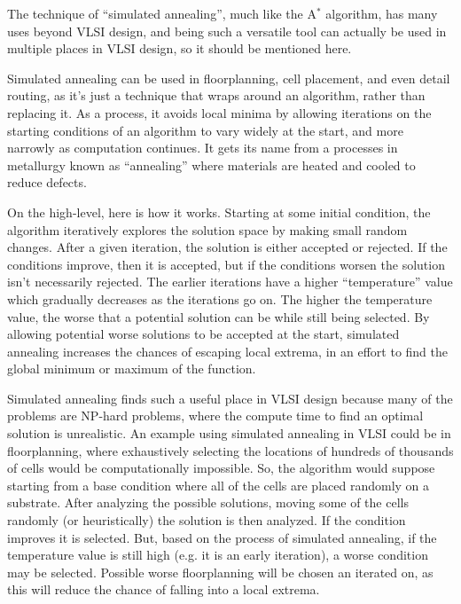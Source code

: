 
The technique of ``simulated annealing'', much like
the A$^*$ algorithm, has many uses beyond VLSI design,
and being such a versatile tool can actually be used in
multiple places in VLSI design, so it should be mentioned
here.

Simulated annealing can be used in floorplanning, cell placement,
and even detail routing, as it's just a technique that wraps
around an algorithm, rather than replacing it. As a process,
it avoids local minima by allowing iterations on the starting
conditions of an algorithm to vary widely at the start, and 
more narrowly as computation continues. It gets its name from
a processes in metallurgy known as ``annealing'' where materials
are heated and cooled to reduce defects.

On the high-level, here is how it works. Starting at
some initial condition, the algorithm iteratively explores
the solution space by making small random changes. After
a given iteration, the solution is either accepted or
rejected. If the conditions improve, then it is accepted,
but if the conditions worsen the solution isn't necessarily
rejected. The earlier iterations have a higher ``temperature''
value which gradually decreases as the iterations go
on. The higher the temperature value, the worse that
a potential solution can be while still being selected.
By allowing potential worse solutions to be accepted
at the start, simulated annealing increases the chances
of escaping local extrema, in an effort to find the
global minimum or maximum of the function. 

Simulated annealing finds such a useful place in VLSI
design because many of the problems are NP-hard problems,
where the compute time to find an optimal solution is
unrealistic. An example using simulated annealing in
VLSI could be in floorplanning, where exhaustively selecting
the locations of hundreds of thousands of cells would
be computationally impossible. So, the algorithm would
suppose starting from a base condition where all of
the cells are placed randomly on a substrate. After
analyzing the possible solutions, moving some of the
cells randomly (or heuristically) the solution is then
analyzed. If the condition improves it is selected.
But, based on the process of simulated annealing, if
the temperature value is still high (e.g. it is an early
iteration), a worse condition may be selected. Possible
worse floorplanning will be chosen an iterated on, as
this will reduce the chance of falling into a local
extrema.
